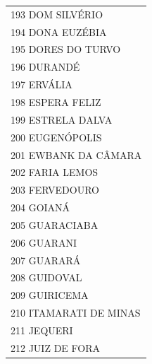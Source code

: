 \documentclass{article}
\begin{document}
\begin{longtable}[c]{m{18cm}}
\multicolumn{1}{l}{ \hspace{2em} 193 DOM SILVÉRIO } \\
\multicolumn{1}{l}{ \hspace{2em} 194 DONA EUZÉBIA } \\
\multicolumn{1}{l}{ \hspace{2em} 195 DORES DO TURVO } \\
\multicolumn{1}{l}{ \hspace{2em} 196 DURANDÉ } \\
\multicolumn{1}{l}{ \hspace{2em} 197 ERVÁLIA } \\
\multicolumn{1}{l}{ \hspace{2em} 198 ESPERA FELIZ } \\
\multicolumn{1}{l}{ \hspace{2em} 199 ESTRELA DALVA } \\
\multicolumn{1}{l}{ \hspace{2em} 200 EUGENÓPOLIS } \\
\multicolumn{1}{l}{ \hspace{2em} 201 EWBANK DA CÂMARA } \\
\multicolumn{1}{l}{ \hspace{2em} 202 FARIA LEMOS } \\
\multicolumn{1}{l}{ \hspace{2em} 203 FERVEDOURO } \\
\multicolumn{1}{l}{ \hspace{2em} 204 GOIANÁ } \\
\multicolumn{1}{l}{ \hspace{2em} 205 GUARACIABA } \\
\multicolumn{1}{l}{ \hspace{2em} 206 GUARANI } \\
\multicolumn{1}{l}{ \hspace{2em} 207 GUARARÁ } \\
\multicolumn{1}{l}{ \hspace{2em} 208 GUIDOVAL } \\
\multicolumn{1}{l}{ \hspace{2em} 209 GUIRICEMA } \\
\multicolumn{1}{l}{ \hspace{2em} 210 ITAMARATI DE MINAS } \\
\multicolumn{1}{l}{ \hspace{2em} 211 JEQUERI } \\
\multicolumn{1}{l}{ \hspace{2em} 212 JUIZ DE FORA } \\

\end{longtable}
\end{document}
